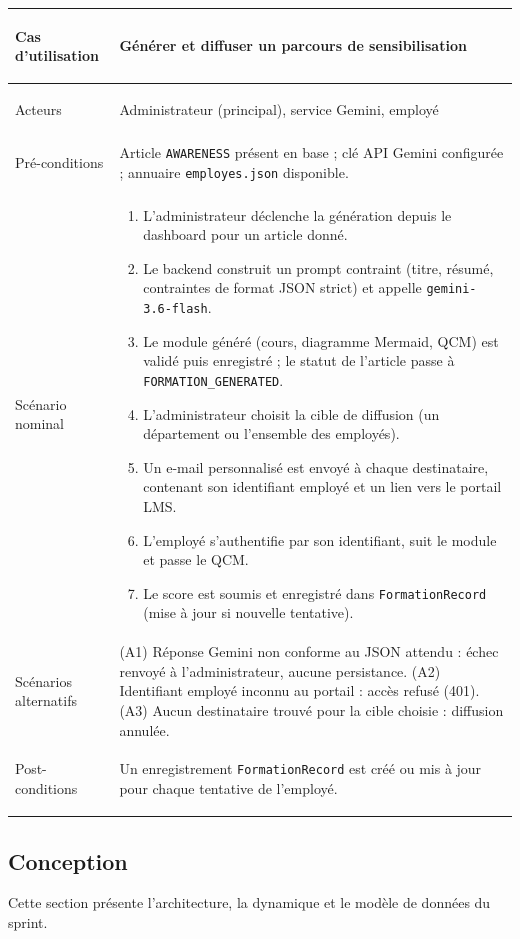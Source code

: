 \begin{xltabular}{\textwidth}{|>{\bfseries\raggedright\arraybackslash}p{3.5cm}|>{\raggedright\arraybackslash}X|}
Cas d'utilisation & Générer et diffuser un parcours de sensibilisation \\ \hline
Acteurs & Administrateur (principal), service Gemini, employé \\ \hline
Pré-conditions & Article \texttt{AWARENESS} présent en base ; clé \ac{API} Gemini configurée ; annuaire \texttt{employes.json} disponible. \\ \hline
Scénario nominal &
\begin{enumerate}[nosep,leftmargin=*]
\item L'administrateur déclenche la génération depuis le dashboard pour un article donné.
\item Le backend construit un prompt contraint (titre, résumé, contraintes de format JSON strict) et appelle \texttt{gemini-3.6-flash}.
\item Le module généré (cours, diagramme Mermaid, QCM) est validé puis enregistré ; le statut de l'article passe à \texttt{FORMATION\_GENERATED}.
\item L'administrateur choisit la cible de diffusion (un département ou l'ensemble des employés).
\item Un e-mail personnalisé est envoyé à chaque destinataire, contenant son identifiant employé et un lien vers le portail \ac{LMS}.
\item L'employé s'authentifie par son identifiant, suit le module et passe le QCM.
\item Le score est soumis et enregistré dans \texttt{FormationRecord} (mise à jour si nouvelle tentative).
\end{enumerate} \\ \hline
Scénarios alternatifs & (A1) Réponse Gemini non conforme au JSON attendu : échec renvoyé à l'administrateur, aucune persistance. \newline (A2) Identifiant employé inconnu au portail : accès refusé (401). \newline (A3) Aucun destinataire trouvé pour la cible choisie : diffusion annulée. \\ \hline
Post-conditions & Un enregistrement \texttt{FormationRecord} est créé ou mis à jour pour chaque tentative de l'employé. \\ \hline

\end{xltabular}
\endgroup


\subsection{Conception}
Cette section présente l'architecture, la dynamique et le modèle de données du sprint.

